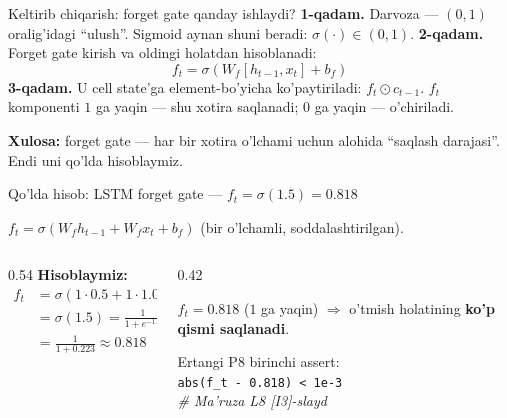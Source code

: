 \documentclass[aspectratio=169,11pt]{beamer}
\begin{document}
\begin{frame}{Keltirib chiqarish: forget gate qanday ishlaydi?}
  \textbf{1-qadam.} Darvoza --- $(0,1)$ oralig'idagi ``ulush''. Sigmoid aynan shuni
  beradi: $\sigma(\cdot)\in(0,1)$.
  \pause
  \textbf{2-qadam.} Forget gate kirish va oldingi holatdan hisoblanadi:
  $$ f_t = \sigma(W_f[h_{t-1},x_t]+b_f) $$
  \pause
  \textbf{3-qadam.} U cell state'ga element-bo'yicha ko'paytiriladi: $f_t\odot c_{t-1}$.
  $f_t$ komponenti $1$ ga yaqin --- shu xotira saqlanadi; $0$ ga yaqin --- o'chiriladi.
  \begin{tcolorbox}[okbox,top=2pt,bottom=2pt]
    \small \textbf{Xulosa:} forget gate --- har bir xotira o'lchami uchun alohida
    ``saqlash darajasi''. Endi uni qo'lda hisoblaymiz.
  \end{tcolorbox}
\end{frame}

%
\begin{frame}{Qo'lda hisob: LSTM forget gate --- $f_t=\sigma(1.5)=0.818$}
  \begin{tcolorbox}[defbox,title={1D LSTM: $W_f=1$, $b_f=0$, $h_{t-1}=0.5$, $x_t=1.0$}]
    \small $f_t=\sigma(W_f h_{t-1} + W_f x_t + b_f)$ (bir o'lchamli, soddalashtirilgan).
  \end{tcolorbox}
  \vspace{0.2em}
  \begin{columns}[T]
    \begin{column}{0.54\textwidth}
      \textbf{Hisoblaymiz:}
      \begin{align*}
        f_t &= \sigma(1{\cdot}0.5 + 1{\cdot}1.0 + 0)\\
            &= \sigma(1.5) = \frac{1}{1+e^{-1.5}}\\
            &= \frac{1}{1+0.223} \approx \mathbf{0.818}
      \end{align*}
    \end{column}
    \begin{column}{0.42\textwidth}
      \begin{tcolorbox}[okbox,top=2pt,bottom=2pt]
        \footnotesize
        $f_t=0.818$ ($1$ ga yaqin) $\Rightarrow$ o'tmish holatining
        \textbf{ko'p qismi saqlanadi}.
      \end{tcolorbox}
      \vspace{3pt}
      \footnotesize\color{halfgray}
      Ertangi P8 birinchi assert:\\
      \texttt{abs(f\_t - 0.818) < 1e-3}\\
      \textit{\# Ma'ruza L8 [I3]-slayd}
    \end{column}
  \end{columns}
\end{frame}
\end{document}
